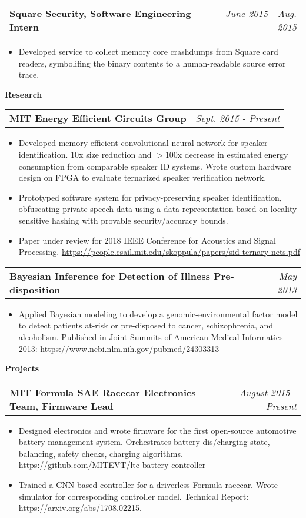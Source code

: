 \documentclass[letterpaper,11pt]{article}
\makeatletter
\newcommand{\resitem}[1]{\item[--] #1 \vspace{-4pt}}
\newcommand{\ressubheadingtwo}[2] {
\begin{tabular*}{7in}{l@{\extracolsep{\fill}}r}
	\textbf{#1} & \textit{#2} \\
\end{tabular*}\vspace{-6pt}}
\makeatother
\begin{document}
    \vspace{0.05in}

    \vspace{0.05in}
	\ressubheadingtwo{Square Security, Software Engineering Intern}{June 2015 - Aug. 2015}
	\begin{itemize}
            \resitem{Developed service to collect memory core crashdumps from Square card readers, symbolifing the binary contents to a human-readable source error trace.}
	\end{itemize}

    \vspace{0.05in}

\large \textbf{Research \vspace{1mm}} \normalsize
    \vspace{0.05in}

	\ressubheadingtwo{MIT Energy Efficient Circuits Group}{Sept. 2015 - Present}{}
	\begin{itemize}
            \resitem{Developed memory-efficient convolutional neural network for speaker identification. 10x size reduction and $>$100x decrease in estimated energy consumption from comparable speaker ID systems. Wrote custom hardware design on FPGA to evaluate ternarized speaker verification network.}
            \resitem{Prototyped software system for privacy-preserving speaker identification, obfuscating private speech data using a data representation based on locality sensitive hashing with provable security/accuracy bounds.}
            \resitem{Paper under review for 2018 IEEE Conference for Acoustics and Signal Processing. \url{https://people.csail.mit.edu/skoppula/papers/sid-ternary-nets.pdf} }
	\end{itemize}

    \ressubheadingtwo{Bayesian Inference for Detection of Illness Pre-disposition}{May 2013}{}
	\begin{itemize}
            \resitem{Applied Bayesian modeling to develop a genomic-environmental factor model to detect patients at-risk or pre-disposed to cancer, schizophrenia, and alcoholism. Published in Joint Summits of American Medical Informatics 2013: \url{https://www.ncbi.nlm.nih.gov/pubmed/24303313}}
	\end{itemize}

\large \textbf{Projects\vspace{1mm}} \normalsize

    \ressubheadingtwo{MIT Formula SAE Racecar Electronics Team, Firmware Lead}{August 2015 - Present}
    \begin{itemize}
        \resitem{Designed electronics and wrote firmware for the first open-source automotive battery management system. Orchestrates battery dis/charging state, balancing, safety checks, charging algorithms. \url{https://github.com/MITEVT/ltc-battery-controller}}
            \resitem{Trained a CNN-based controller for a driverless Formula racecar. Wrote simulator for corresponding controller model. Technical Report: \url{https://arxiv.org/abs/1708.02215}.}
    \end{itemize}
\end{document}
